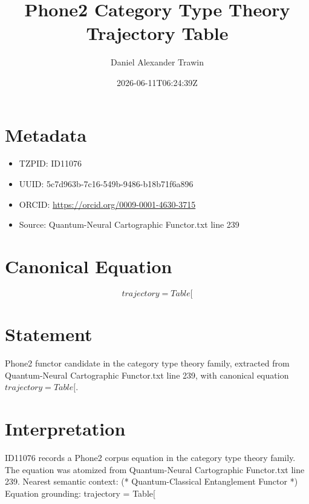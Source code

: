 \documentclass[11pt]{article}
\title{Phone2 Category Type Theory Trajectory Table}
\author{Daniel Alexander Trawin}
\date{2026-06-11T06:24:39Z}
\begin{document}
\maketitle
\section*{Metadata}
\begin{itemize}
\item TZPID: ID11076
\item UUID: 5c7d963b-7c16-549b-9486-b18b71f6a896
\item ORCID: \url{https://orcid.org/0009-0001-4630-3715}
\item Source: Quantum-Neural Cartographic Functor.txt line 239
\end{itemize}
\section*{Canonical Equation}
\[
trajectory = Table[
\]
\section*{Statement}
Phone2 functor candidate in the category type theory family, extracted from Quantum-Neural Cartographic Functor.txt line 239, with canonical equation $trajectory = Table[$.
\section*{Interpretation}
ID11076 records a Phone2 corpus equation in the category type theory family. The equation was atomized from Quantum-Neural Cartographic Functor.txt line 239. Nearest semantic context: (* Quantum-Classical Entanglement Functor *) Equation grounding: trajectory = Table[
\end{document}
